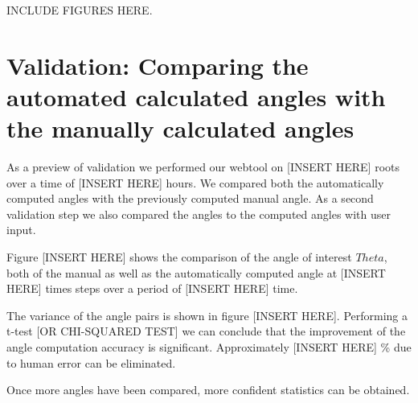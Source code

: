 INCLUDE FIGURES HERE.

\section{Validation: Comparing the automated calculated angles with the manually calculated angles}

As a preview of validation we performed our webtool on [INSERT HERE] roots over a time of [INSERT HERE] hours. We compared both the automatically computed angles with the previously computed manual angle. As a second validation step we also compared the angles to the computed angles with user input.

Figure [INSERT HERE] shows the comparison of the angle of interest \( Theta \), both of the manual as well as the automatically computed angle at [INSERT HERE] times steps over a period of [INSERT HERE] time.

The variance of the angle pairs is shown in figure [INSERT HERE]. Performing a t-test [OR CHI-SQUARED TEST] we can conclude that the improvement of the angle computation accuracy is significant. Approximately [INSERT HERE] \% due to human error can be eliminated.

Once more angles have been compared, more confident statistics can be obtained. 


